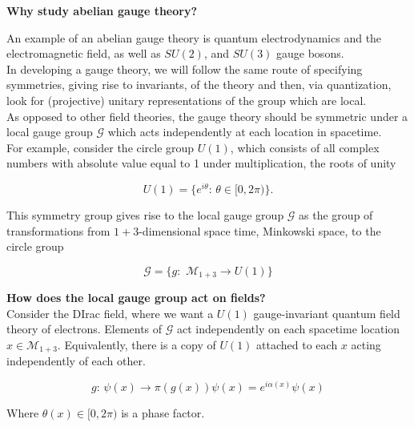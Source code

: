 
\noindent \textbf{Why study abelian gauge theory?}

\noindent An example of an abelian gauge theory is quantum electrodynamics and the electromagnetic field, as well as $SU(2)$, and $SU(3)$ gauge bosons. \\

\noindent In developing a gauge theory, we will follow the same route of specifying symmetries, giving rise to invariants, of the theory and then, via quantization, look for (projective) unitary representations of the group which are local. \\

\noindent As opposed to other field theories, the gauge theory should be symmetric under a local gauge group $\mathcal{G}$ which acts independently at each location in spacetime. \\

\noindent For example, consider the circle group $U(1)$, which consists of all complex numbers with absolute value equal to 1 under multiplication, the roots of unity

\begin{equation}
U(1) = \{ e^{i \theta} : \, \theta \in [0, 2 \pi ) \}.
\end{equation}

\noindent This symmetry group gives rise to the local gauge group $\mathcal{G}$ as the group of transformations from $1+3$-dimensional space time, Minkowski space, to the circle group

\begin{equation}
\mathcal{G} = \{ g: \,\, \mathcal{M}_{1+3} \rightarrow U(1) \}
\end{equation}

\noindent \textbf{How does the local gauge group act on fields? }\\

\noindent Consider the DIrac field, where we want a $U(1)$ gauge-invariant quantum field theory of electrons. Elements of $\mathcal{G}$ act independently on each spacetime location$x \in \mathcal{M}_{1+3}$. Equivalently, there is a copy of $U(1)$ attached to each $x$ acting independently of each other.

\begin{equation}
g: \, \psi (x) \rightarrow \pi ( g (x) ) \psi(x) = e^{i \alpha (x)} \psi (x)
\end{equation}

\noindent Where $\theta(x) \in [ 0 , 2 \pi )$ is a phase factor. \\

